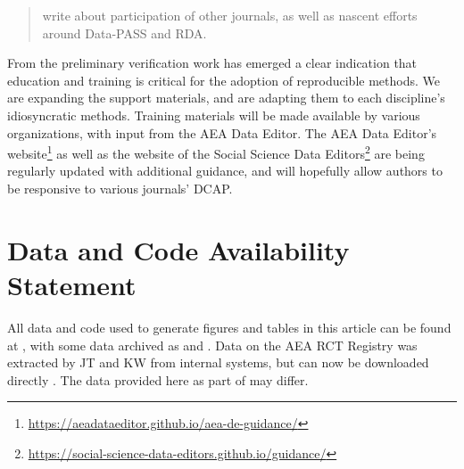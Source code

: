 \documentclass[PP]{AEA}
\newcommand{\urlcite}[2]{#2\footnote{\url{#1}}}
\begin{document}
\begin{quote}
    write about participation of other journals, as well as nascent efforts around Data-PASS and RDA.
\end{quote}

From the preliminary verification work has emerged a clear indication that education and training is critical for the adoption of reproducible methods. We are expanding the support materials, and are adapting them to each discipline's idiosyncratic methods. Training materials will be made available by various organizations, with input from the AEA Data Editor. The \urlcite{https://aeadataeditor.github.io/aea-de-guidance/}{AEA Data Editor's website} as well as the website of the \urlcite{https://social-science-data-editors.github.io/guidance/}{Social Science Data Editors} are being regularly updated with additional guidance, and will hopefully allow authors to be responsive to various journals' \ac{DCAP}.

\section{Data and Code Availability Statement}
\label{sec:dcas}

All data and code used to generate figures and tables in this article can be found at \citet{E117884V1}, with some data archived as \citet{E117873V1} and \citet{E117876V1}. Data on the AEA RCT Registry was extracted by JT and KW from internal systems, but can now be downloaded directly \citep{DVN/DFMLIU_2020}. The data provided here as part of \citet{E117884V1} may differ.

\FloatBarrier
%
%



\appendix

%
\end{document}
